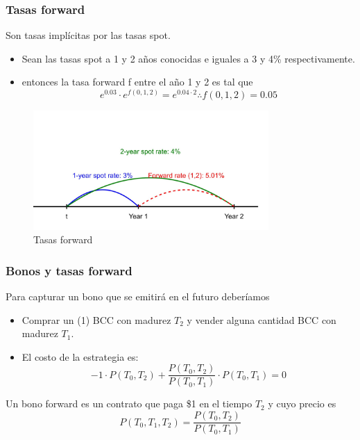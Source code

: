 \begin{frame}
    \frametitle{Tasas forward}
    Son tasas implícitas por las tasas spot.
    \begin{itemize}
        \item Sean las tasas spot a 1 y 2 años conocidas e iguales a 3 y 4\% respectivamente.
        \item entonces la tasa forward f entre el año 1 y 2 es tal que
        \[e^{0.03} \cdot e^{f(0,1,2)} = e^{0.04 \cdot 2} \therefore f(0,1,2)=0.05 \]
    \end{itemize}
        \begin{figure}[h]
        \centering
        \includegraphics[width=0.8\textwidth]{img/cap1/forward-rates.jpg}
        \caption{Tasas forward}
        \label{forward_rates}
    \end{figure}
\end{frame}


\begin{frame}
    \frametitle{Bonos y tasas forward}
    Para capturar un bono que se emitirá en el futuro deberíamos
    \begin{itemize}
        \item Comprar un (1) BCC con madurez $T_2$ y vender alguna cantidad BCC con madurez $T_1$.
        \item El costo de la estrategia es:
        \begin{equation*}
            -1 \cdot P(T_0,T_2) + \frac{P(T_0,T_2)}{P(T_0,T_1)} \cdot P(T_0,T_1) = 0
        \end{equation*}
    \end{itemize}
    \begin{defin}
        Un bono forward es un contrato que paga \$1 en el tiempo $T_2$ y cuyo precio es
        \begin{equation*}
            P(T_0, T_1, T_2) = \frac{P(T_0,T_2)}{P(T_0,T_1)}
        \end{equation*}
    \end{defin}
\end{frame}

